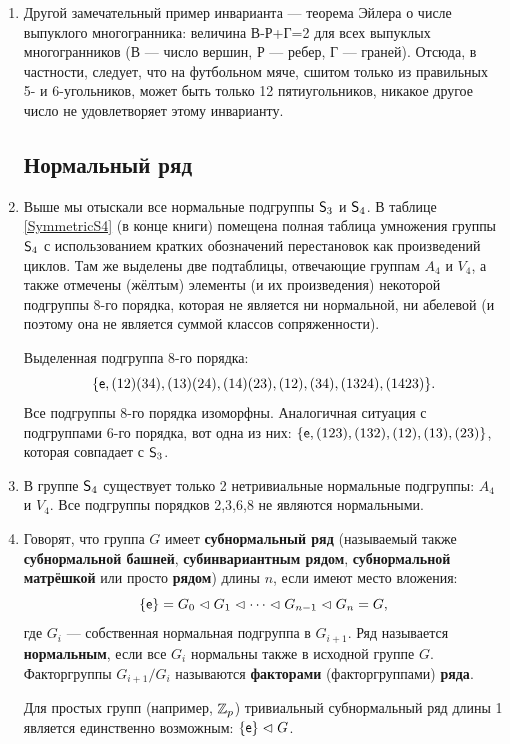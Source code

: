 \begin{enumerate}
\item Другой замечательный пример инварианта --- теорема Эйлера о числе выпуклого многогранника: величина В-Р+Г=2 для всех выпуклых многогранников (В --- число вершин, Р --- ребер, Г --- граней). Отсюда, в частности, следует, что на футбольном мяче, сшитом только из правильных 5- и 6-угольников, может быть только 12 пятиугольников, никакое другое число не удовлетворяет этому инварианту.


\subsection*{Нормальный ряд}

\item Выше мы отыскали все нормальные подгруппы ${\mathsf{S}}_3$ и ${\mathsf{S}}_4$. В таблице \ref{SymmetricS4} (в конце книги) помещена полная таблица умножения группы ${\mathsf{S}}_4$ с использованием кратких обозначений перестановок как произведений циклов. Там же выделены две подтаблицы, отвечающие группам $A_4$ и $V_4$, а также отмечены (жёлтым) элементы (и их произведения) некоторой подгруппы 8-го порядка, которая не является ни нормальной, ни абелевой (и поэтому она не является суммой классов сопряженности).

Выделенная подгруппа 8-го порядка:
$$\{\mathsf e, (12)(34), (13)(24), (14)(23), (12), (34), (1324), (1423)\}.
$$
Все подгруппы 8-го порядка изоморфны. Аналогичная ситуация с подгруппами 6-го порядка, вот одна из них:
$\{\mathsf e, (123), (132), (12), (13), (23) \}$, которая совпадает с ${\mathsf{S}}_3$.

\item В группе ${\mathsf{S}}_4$ существует только 2 нетривиальные нормальные подгруппы: $A_4$ и $V_4$. Все подгруппы порядков 2,3,6,8 не являются нормальными.

\item Говорят, что группа $G$ имеет \textbf{субнормальный ряд} (называемый также \textbf{субнормальной башней}, \textbf{субинвариантным рядом}, \textbf{субнормальной матрёшкой} или просто \textbf{рядом}) длины $n$, если имеют место вложения:
$$
\{\mathsf e\}=G_0\vartriangleleft G_1\vartriangleleft\dots\vartriangleleft G_{n-1}\vartriangleleft G_n=G,
$$
где $G_i$ --- собственная нормальная подгруппа в $G_{i+1}$. Ряд называется \textbf{нормальным}, если все $G_i$ нормальны также в исходной группе $G$. Факторгруппы $G_{i+1}/G_i$ называются \textbf{факторами} (факторгруппами) \textbf{ряда}.

Для простых групп (например, $\mathbb Z_p$) тривиальный субнормальный ряд длины 1 является единственно возможным: $\{\mathsf e\}\vartriangleleft G$.


\end{enumerate}
